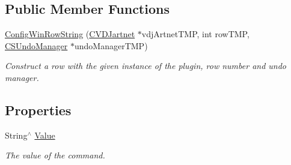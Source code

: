 \subsection*{Public Member Functions}
\begin{DoxyCompactItemize}
\item 
\mbox{\label{classConfigWinRowString_a1c009e54fd745979399fcbf33949341b}} 
\hyperlink{classConfigWinRowString_a1c009e54fd745979399fcbf33949341b}{Config\+Win\+Row\+String} (\hyperlink{classCVDJartnet}{C\+V\+D\+Jartnet} $\ast$vdj\+Artnet\+T\+MP, int row\+T\+MP, \hyperlink{classCSUndoManager}{C\+S\+Undo\+Manager} $\ast$undo\+Manager\+T\+MP)
\begin{DoxyCompactList}\small\item\em Construct a row with the given instance of the plugin, row number and undo manager. \end{DoxyCompactList}\end{DoxyCompactItemize}
\subsection*{Properties}
\begin{DoxyCompactItemize}
\item 
String$^\wedge$ \hyperlink{classConfigWinRowString_ad8324c1c0df6f0069626c15119539e6c}{Value}
\begin{DoxyCompactList}\small\item\em The value of the command. \end{DoxyCompactList}\end{DoxyCompactItemize}
